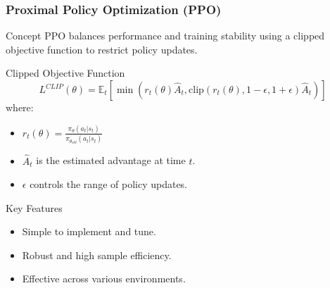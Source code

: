 \documentclass[aspectratio=169]{beamer}
\begin{document}
\begin{frame}[fragile]
    \frametitle{Proximal Policy Optimization (PPO)}
    \begin{block}{Concept}
        PPO balances performance and training stability using a clipped objective function to restrict policy updates.
    \end{block}

    \begin{block}{Clipped Objective Function}
        \begin{equation}
            L^{CLIP}(\theta) = \mathbb{E}_t \left[ \min \left( r_t(\theta) \hat{A}_t, \text{clip}(r_t(\theta), 1 - \epsilon, 1 + \epsilon) \hat{A}_t \right) \right]
        \end{equation}
        where:
        \begin{itemize}
            \item \( r_t(\theta) = \frac{\pi_\theta(a_t|s_t)}{\pi_{\theta_{old}}(a_t|s_t)} \)
            \item \( \hat{A}_t \) is the estimated advantage at time \(t\).
            \item \( \epsilon \) controls the range of policy updates.
        \end{itemize}
    \end{block}

    \begin{block}{Key Features}
        \begin{itemize}
            \item Simple to implement and tune.
            \item Robust and high sample efficiency.
            \item Effective across various environments.
        \end{itemize}
    \end{block}
\end{frame}
\end{document}
